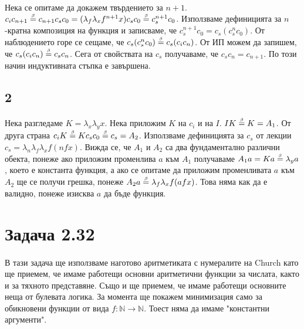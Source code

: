 \documentclass[12pt]{article}
\begin{document}
\paragraph*{}
Нека се опитаме да докажем твърдението за $n+1$. $c_i c_{n+1} \betaeq c_{n+1} c_s c_0 = (\lambda_f \lambda_x f^{n+1} x) c_s c_0 \betaeq c_s^{n+1} c_0$. Използваме дефиницията за $n$-кратна композиция на функция и записваме, че $c_s^{n+1} c_0 = c_s (c_s^n c_0)$. От наблюдението горе се сещаме, че $c_s (c_s^n c_0) \betaeq c_s (c_i c_n)$. От ИП можем да запишем, че $c_s (c_i c_n) \betaeq c_s c_n$. Сега от свойствата на $c_s$ получаваме, че $c_s c_n = c_{n+1}$. По този начин индуктивната стъпка е завършена.

\subsection*{2}
\paragraph*{}
Нека разгледаме $K = \lambda_x \lambda_y x$. Нека приложим $K$ на $c_i$ и на $I$. $I K \betaeq K = A_1$. От друга страна $c_i K \betaeq K c_s c_0 \betaeq c_s = A_2$. Използваме дефиницията за $c_s$ от лекции $c_s = \lambda_n \lambda_f \lambda_x f (n f x)$. Вижда се, че $A_1$ и $A_2$ са два фундаментално различни обекта, понеже ако приложим променлива $a$ към $A_1$ получаваме $A_1 a = Ka \betaeq \lambda_y a$, което е константа функция, а ако се опитаме да приложим променливата $a$ към $A_2$ ще се получи грешка, понеже $A_2 a \betaeq \lambda_f \lambda_x f(afx)$. Това няма как да е валидно, понеже изисква $a$ да бъде функция.

\section*{Задача 2.32}
\paragraph*{}
В тази задача ще използваме наготово аритметиката с нумералите на Church като ще приемем, че имаме работещи основни аритметични функции за числата, както и за тяхното представяне. Също и ще приемем, че имаме работещи основните неща от булевата логика. За момента ще покажем минимизация само за обикновени функции от вида $f: \mathbb{N} \rightarrow \mathbb{N}$. Тоест няма да имаме "константни аргументи". 
\end{document}
